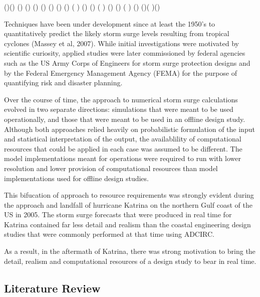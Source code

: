 \documentclass[12pt]{article}
\begin{document}
(\cite{LynchDR2004})(\cite {ASGSOperatorsGuide2011}) (\cite
{ASGSDevelopersGuide2011}) (\cite {DietrichJC2012}) (\cite
{FlatherRA1994}) (\cite{GraberHC2006}) (\cite {HollandGJ1980}) (\cite
{HoustonSH1999}) (\cite{HubbertGD1991}) ( \cite {LynchDR2004}) (\cite
{MasseyWG2007}) (\cite{OConnorWP1999}) ( \cite {VerlaanM2005}) (\cite
{XieL2006})  (\cite{KennedyA2010}) ( \cite{GlahnB2009})
(\cite{GlahnB2009}) (\cite{KimSC1996})( \cite{BooijN1999})(\cite
{ChuP2009})

Techniques have been under development since at least the 1950’s to 
quantitatively predict the likely storm surge levels resulting from 
tropical cyclones (Massey et al, 2007). While initial investigations 
were motivated by scientific curiosity, applied studies were later 
commissioned by federal agencies such as the US Army Corps of 
Engineers for storm surge protection designs and by the Federal 
Emergency Management Agency (FEMA) for the purpose of quantifying 
risk and disaster planning. 

Over the course of time, the approach to numerical storm surge 
calculations evolved in two separate directions: simulations that 
were meant to be used operationally, and those that were meant to be 
used in an offline design study. Although both approaches relied 
heavily on probabilistic formulation of the input and statistical 
interpretation of the output, the availablility of computational 
resources that could be applied in each case was assumed to be 
different. The model implementations meant for operations were 
required to run with lower resolution and lower provision of 
computational resources than model implementations used for offline 
design studies. 

This bifucation of approach to resource requirements was strongly 
evident during the approach and landfall of hurricane Katrina on the 
northern Gulf coast of the US in 2005. The storm surge forecasts 
that were produced in real time for Katrina contained far less 
detail and realism than the coastal engineering design studies that 
were commonly performed at that time using ADCIRC. 

As a result, in the aftermath of Katrina, there was strong 
motivation to bring the detail, realism and computational resources 
of a design study to bear in real time.  

\subsection{Literature Review}
\end{document}
